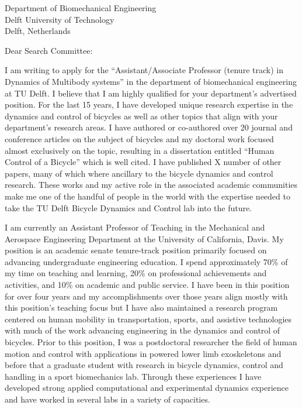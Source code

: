 \documentclass{letter}
\date{}
\begin{document}
\begin{letter}{
  Department of Biomechanical Engineering \\
  Delft University of Technology \\
  Delft, Netherlands
}

\opening{Dear Search Committee:}

I am writing to apply for the ``Assistant/Associate Professor (tenure track) in
Dynamics of Multibody systems'' in the department of biomechanical engineering
at TU Delft. I believe that I am highly qualified for your department's
advertised position.  For the last 15 years, I have developed unique research
expertise in the dynamics and control of bicycles as well as other topics that
align with your department's research areas. I have authored or co-authored
over 20 journal and conference articles on the subject of bicycles and my
doctoral work focused almost exclusively on the topic, resulting in a
dissertation entitled ``Human Control of a Bicycle'' which is well cited. I
have published X number of other papers, many of which where ancillary to the
bicycle dynamics and control research. These works and my active role in the
associated academic communities make me one of the handful of people in the
world with the expertise needed to take the TU Delft Bicycle Dynamics and
Control lab into the future.

I am currently an Assistant Professor of Teaching in the Mechanical and
Aerospace Engineering Department at the University of California, Davis. My
position is an academic senate tenure-track position primarily focused on
advancing undergraduate engineering education. I spend approximately 70\% of my
time on teaching and learning, 20\% on professional achievements and
activities, and 10\% on academic and public service. I have been in this
position for over four years and my accomplishments over those years align
mostly with this position's teaching focus but I have also maintained a
research program centered on human mobility in transportation, sports, and
assistive technologies with much of the work advancing engineering in the
dynamics and control of bicycles. Prior to this position, I was a postdoctoral
researcher the field of human motion and control with applications in powered
lower limb exoskeletons and before that a graduate student with research in
bicycle dynamics, control and handling in a sport biomechanics lab. Through
these experiences I have developed strong applied computational and
experimental dynamics experience and have worked in several labs in a variety
of capacities.


\end{letter}
\end{document}
